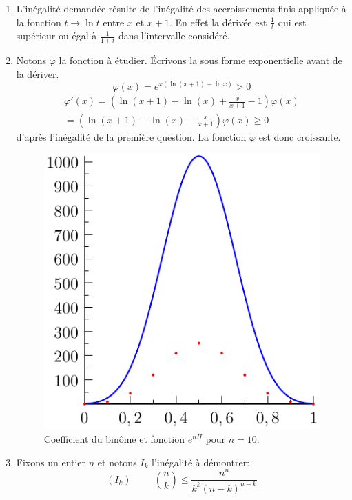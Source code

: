 \begin{enumerate}
 \item L'inégalité demandée résulte de l'inégalité des accroissements finis appliquée à la fonction $t\rightarrow \ln t$ entre $x$ et $x+1$. En effet la dérivée est $\frac{1}{t}$ qui est supérieur ou égal à $\frac{1}{1+t}$ dans l'intervalle considéré.
 \item Notons $\varphi$ la fonction à étudier. \'Ecrivons la sous forme exponentielle avant de la dériver.
\begin{displaymath}
 \varphi(x) = 
e^{x\left(\ln(x+1)-\ln x \right) }>0
\end{displaymath}
\begin{multline*}
 \varphi'(x)=\left(\ln(x+1)-\ln(x)+\frac{x}{x+1}-1 \right)\varphi(x)\\
 =\left(\ln(x+1)-\ln(x)-\frac{x}{x+1} \right)\varphi(x)\geq 0
\end{multline*}
d'après l'inégalité de la première question. La fonction $\varphi$ est donc croissante.
\begin{figure}[h!]
 \centering
 \includegraphics{Cmajcobi_1.pdf}
 \caption{Coefficient du binôme et fonction $e^{nH}$ pour $n=10$.}
 \label{fig:Cmajcobi_1}
\end{figure}
 \item Fixons un entier $n$ et notons $I_k$ l'inégalité à démontrer:
\begin{displaymath}
 (I_k)\hspace{1cm}\binom{n}{k}\leq\frac{n^n}{k^k(n-k)^{n-k}}

\end{displaymath}
\end{enumerate}
